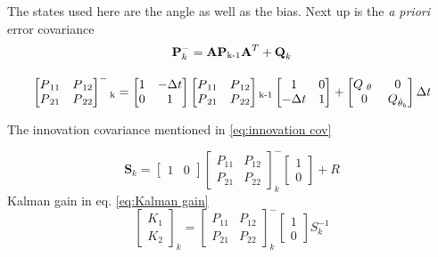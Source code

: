 \documentclass[a4paper,11pt]{kth-mag}
\begin{document}
The states used here  are the angle as well as the bias. Next up is the \textit{a priori} error covariance
\begin{equation}
\textbf{P}^-_k = \textbf{A} \textbf{P}\textsubscript{k-1}\textbf{A}^T + \textbf{Q}_k
\end{equation}

\begin{equation}
\begin{bmatrix}
P\textsubscript{11} & P\textsubscript{12} \\
P\textsubscript{21} & P\textsubscript{22}
\end{bmatrix}^-\textsubscript{k} =
\begin{bmatrix}
1  & -\Delta t \\
0   & 1
\end{bmatrix}
\begin{bmatrix}
P\textsubscript{11} & P\textsubscript{12} \\
P\textsubscript{21} & P\textsubscript{22}
\end{bmatrix}\textsubscript{k-1}
\begin{bmatrix}
1 & 0 \\
-\Delta t & 1
\end{bmatrix}
+
\begin{bmatrix}
Q\textsubscript{ $\theta$ } & 0 \\
0 & Q\textsubscript{$\dot{\theta}_b$}
\end{bmatrix}
\Delta t
\end{equation}

The innovation covariance mentioned in \ref{eq:innovation cov}

\begin{equation} 
\textbf{S}_k=
\begin{bmatrix}
1 & 0
\end{bmatrix}
\begin{bmatrix}
P_{11} & P_{12} \\
P_{21} & P_{22} 
\end{bmatrix}^- _k
\begin{bmatrix}
1 \\ 0
\end{bmatrix}
+
R
\end{equation}
Kalman gain in eq. \ref{eq:Kalman gain}
\begin{equation}
\begin{bmatrix}
K_1 \\ K_2
\end{bmatrix}_k
=
\begin{bmatrix}
P_{11} & P_{12} \\
P_{21} & P_{22}
\end{bmatrix}^-_k
\begin{bmatrix}
1 \\ 0
\end{bmatrix}
S^{-1}_k
\end{equation}
\end{document}
